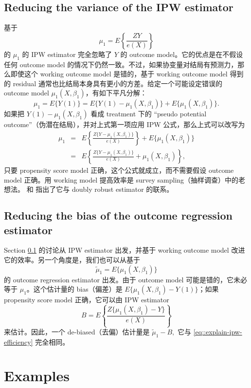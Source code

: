\subsection{Reducing the variance of the IPW estimator}\label{sec::improving-ipw}


基于
$$
\mu_1 = E\left\{   \frac{ZY}{e(X)}   \right\}
$$
的 $\mu_1$ 的 IPW estimator 完全忽略了 $Y$ 的 outcome model。它的优点是在不假设任何 outcome model 的情况下仍然一致。不过，如果协变量对结局有预测力，那么即使这个 working outcome model 是错的，基于 working outcome model 得到的 residual 通常也比结局本身具有更小的方差。给定一个可能设定错误的 outcome model $\mu_1(X, \beta_1)$，有如下平凡分解：
$$
\mu_1  = E\{ Y(1) \} = E\{ Y(1)  -\mu_1(X, \beta_1) \} + E\{\mu_1(X, \beta_1)\}.
$$
如果把 $Y(1)  -\mu_1(X, \beta_1)$ 看成 treatment 下的 ``pseudo potential outcome''（伪潜在结局），并对上式第一项应用 IPW 公式，那么上式可以改写为
\begin{eqnarray}
\mu_1  &=& E\left\{ \frac{Z \{Y  -\mu_1(X, \beta_1) \}}{e(X)} \right\} + E\{\mu_1(X, \beta_1)\}  \label{eq::explain-ipw-efficiency-basic}  \\
&=& E\left\{ \frac{Z \{Y  -\mu_1(X, \beta_1) \}}{e(X)}  +  \mu_1(X, \beta_1) \right\} ,\label{eq::explain-ipw-efficiency}
\end{eqnarray}
只要 propensity score model 正确，这个公式就成立，而不需要假设 outcome model 正确。用 working model 提高效率是 survey sampling（抽样调查）中的老想法。\citet{little2004robust} 和 \citet{lumley2011connections} 指出了它与 doubly robust estimator 的联系。



\subsection{Reducing the bias of the outcome regression estimator}\label{sec::improving-outreg}


Section \ref{sec::improving-ipw} 的讨论从 IPW estimator 出发，并基于 working outcome model 改进它的效率。另一个角度是，我们也可以从基于
$$
\tilde{\mu}_1 = E\{\mu_1(X, \beta_1)\} 
$$
的 outcome regression estimator 出发。由于 outcome model 可能是错的，它未必等于 $\mu_1$。这个估计量的 bias（偏差）是 $ E\{\mu_1(X, \beta_1)  -  Y(1)\}   $；如果 propensity score model 正确，它可以由 IPW estimator
$$
B = 
E\left\{ \frac{Z \{\mu_1(X, \beta_1) - Y\}}{e(X)} \right\} 
$$
来估计。因此，一个 de-biased（去偏）估计量是
$
\tilde{\mu}_1 - B  ,
$
它与 \eqref{eq::explain-ipw-efficiency} 完全相同。


\section{Examples}
\label{sec::dr-examples}


